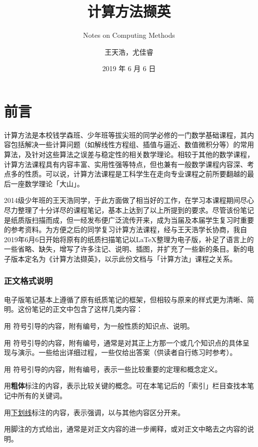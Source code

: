 \documentclass[opensource,b5paper,sourcefont]{qyxf-book}
\title{计算方法撷英}
\subtitle{Notes on Computing Methods}
\author{王天浩，尤佳睿}
\date{2019 年 6 月 6 日}
\newcommand{\tl}{\setlength{\itemsep}{0pt}\setlength{\parskip}{0pt}}
\renewcommand{\emph}[1]{\uline{#1}}
\begin{document}
\maketitle

\frontmatter
\chapter{前言}
计算方法是本校钱学森班、少年班等拔尖班的同学必修的一门数学基础课程，其内容包括解决一些计算问题（如解线性方程组、插值与逼近、数值微积分等）的常用算法，及针对这些算法之误差与稳定性的相关数学理论。相较于其他的数学课程，计算方法课程具有内容丰富、实用性强等特点，但也兼有一般数学课程内容深、考点多的性质。可以说，计算方法课程是工科学生在走向专业课程之前所要翻越的最后一座数学理论「大山」。

2014级少年班的王天浩同学，于此方面做了相当好的工作，在学习本课程期间尽心尽力整理了十分详尽的课程笔记，基本上达到了以上所提到的要求。尽管该份笔记是纸质版扫描而成，但一经发布便广泛流传开来，成为当届及本届学生复习时重要的参考资料。为方便之后的同学复习计算方法课程，经与王天浩学长协商，我自2019年6月6日开始将原有的纸质扫描笔记以\LaTeX 整理为电子版，补足了语言上的一些省略、缺失，增写了许多注记、说明、插图，并扩充了一些新的条目。新的电子版本定名为《计算方法撷英》，以示此份文档与「计算方法」课程之关系。

\subsection*{正文格式说明}
电子版笔记基本上遵循了原有纸质笔记的框架，但相较与原来的样式更为清晰、简明。这份笔记的正文中包含了这样几类内容：
\begin{description}\tl
    \item[条目] 用  符号引导的内容，附有编号，为一般性质的知识点、说明。
    \item[例题] 用  符号引导的内容，附有编号，通常是对其正上方那一个或几个知识点的具体呈现与演示。一些给出详细过程，一些仅给出答案（供读者自行练习时参考）。
    \item[定理/定义] 用  符号引导的内容，附有编号，表示一些比较重要的定理和概念定义。
    \item[关键词] 用\textbf{粗体}标注的内容，表示比较关键的概念。可在本笔记后的「索引」栏目查找本笔记中所有的关键词。 
    \item[强调] 用\emph{下划线}标注的内容，表示强调，以与其他内容区分开来。 
    \item[注记] 用脚注的方式给出，通常是对正文内容的进一步阐释，或对正文中略去之内容的说明。
\end{description}
\end{document}
